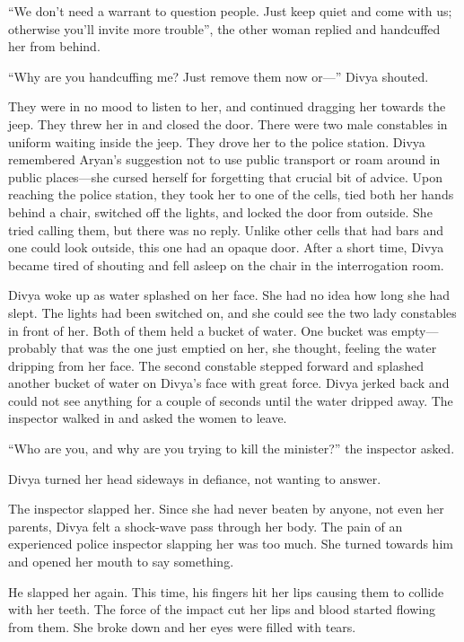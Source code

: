 “We don't need a warrant to question people. Just keep quiet and come with us;
otherwise you'll invite more trouble”, the other woman replied and handcuffed
her from behind.

“Why are you handcuffing me? Just remove them now or—” Divya shouted.

They were in no mood to listen to her, and continued dragging her towards the
jeep. They threw her in and closed the door. There were two male constables in
uniform waiting inside the jeep. They drove her to the police station. Divya
remembered Aryan's suggestion not to use public transport or roam around in
public places—she cursed herself for forgetting that crucial bit of advice. Upon
reaching the police station, they took her to one of the cells, tied both her
hands behind a chair, switched off the lights, and locked the door from outside.
She tried calling them, but there was no reply. Unlike other cells that had bars
and one could look outside, this one had an opaque door. After a short time,
Divya became tired of shouting and fell asleep on the chair in the interrogation
room.

Divya woke up as water splashed on her face. She had no idea how long she had
slept. The lights had been switched on, and she could see the two lady
constables in front of her. Both of them held a bucket of water. One bucket
was empty—probably that was the one just emptied on her, she thought, feeling
the water dripping from her face. The second constable stepped forward and
splashed another bucket of water on Divya's face with great force. Divya jerked
back and could not see anything for a couple of seconds until the water dripped
away. The inspector walked in and asked the women to leave.

“Who are you, and why are you trying to kill the minister?” the inspector asked.

Divya turned her head sideways in defiance, not wanting to answer.

The inspector slapped her. Since she had never beaten by anyone, not even her
parents, Divya felt a shock-wave pass through her body. The pain of an
experienced police inspector slapping her was too much. She turned towards him
and opened her mouth to say something.

He slapped her again. This time, his fingers hit her lips causing them to
collide with her teeth. The force of the impact cut her lips and blood started
flowing from them.  She broke down and her eyes were filled with tears.

